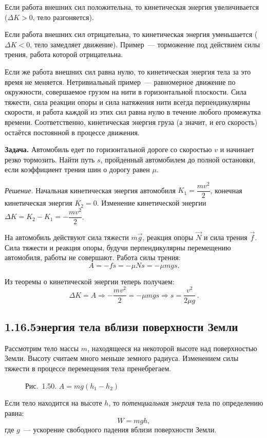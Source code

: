 Если работа внешних сил положительна, то кинетическая энергия увеличивается ($\Delta K>0$, тело разгоняется).

Если работа внешних сил отрицательна, то кинетическая энергия уменьшается ($\Delta K<0$, тело замедляет движение). Пример~--- торможение под действием силы трения, работа ко\-торой отрицательна.

Если же работа внешних сил равна нулю, то кинетическая энергия тела за это время не ме\-няется. Нетривиальный пример~--- равномерное движение по окружности, совершаемое грузом на нити в горизонтальной плоскости. Сила тяже\-сти, сила реакции опоры и сила натяжения нити всегда перпендикулярны скорости, и работа каждой из этих сил равна нулю в течение любого промежутка времени. Соответственно, кинетическая энергия груза (а значит, и его скорость) остаётся постоянной в процессе движе\-ния.

\vspace{10.331pt}\noindent
\textbf{Задача.} Автомобиль едет по горизонтальной дороге со скоростью $v$ и начинает резко тормо\-зить. Найти путь $s$, пройденный автомобилем до полной остановки, если коэффициент трения шин о дорогу равен $\mu$.

\vspace{5.165pt}\noindent
\textit{Решение.} Начальная кинетическая энергия автомобиля $K_1=\dfrac{mv^2}{2}$, конечная кинетическая энергия $K_2=0$. Изменение кинетической энер\-гии $\Delta K=K_2-K_1=-\dfrac{mv^2}{2}$.

На автомобиль действуют сила тяже\-сти $m\vec g$, реакция опоры $\vec N$ и сила трения $\vec f$. Сила тяже\-сти и реакция опоры, будучи перпендикулярны перемещению автомобиля, работы не соверша\-ют. Работа силы трения:
\[
A=-fs=-\mu Ns=-\mu mgs.
\]

Из теоремы о кинетической энер\-гии теперь получаем:
\[
\Delta K=A\Rightarrow-\frac{mv^2}{2}=-\mu mgs\Rightarrow s=\frac{v^2}{2\mu g}\,.
\]
\subsection*{1.16.5 энергия тела вблизи поверхности Земли}
\noindent Рассмотрим тело массы $m$, находящееся на некоторой высоте над поверхностью Земли. Высоту считаем много меньше земного радиуса. Изменением силы тяже\-сти в процессе перемещения тела пренебрегаем.

\begin{figure}
\vspace{-2.501pt}
\centering\hypertarget{fig150}{}\ReplicaGravityDiagram
\par\vspace{10.05pt}\hspace*{3.916bp}Рис.~1.50. $A=mg(h_1-h_2)$
\vspace{-6pt}
\end{figure}
Если тело находится на высоте $h$, то \textit{потенциаль\-ная энергия} тела по определению равна:
\[
W=mgh,
\]
\noindent где $g$~--- ускорение свободного падения вблизи поверхности Земли.

